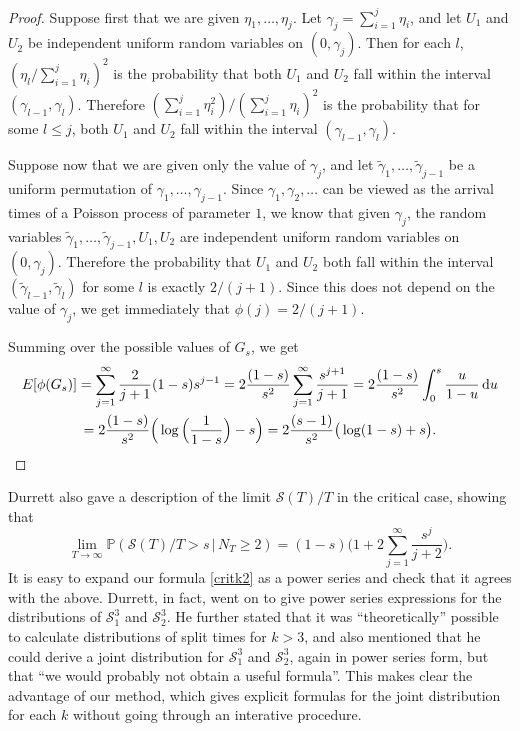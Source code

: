 \documentclass{article}
\theoremstyle{plain}
\theoremstyle{definition}
\renewcommand{\P}{\mathbb{P}}
\renewcommand{\d}{{\rm{d}}}
\renewcommand{\S}{\mathcal{S}}
\begin{document}
\begin{proof}
Suppose first that we are given $\eta_1,\ldots,\eta_j$. Let $\gamma_j = \sum_{i=1}^j \eta_i$, and let $U_1$ and $U_2$ be independent uniform random variables on $(0,\gamma_j)$. Then for each $l$, $(\eta_l/\sum_{i=1}^j \eta_i)^2$ is the probability that both $U_1$ and $U_2$ fall within the interval $(\gamma_{l-1},\gamma_l)$. Therefore  $(\sum_{i=1}^j \eta_i^2)/(\sum_{i=1}^j \eta_i)^2$ is the probability that for some $l\le j$, both $U_1$ and $U_2$ fall within the interval $(\gamma_{l-1},\gamma_l)$.

Suppose now that we are given only the value of $\gamma_j$, and let $\tilde\gamma_1,\ldots,\tilde\gamma_{j-1}$ be a uniform permutation of $\gamma_1,\ldots,\gamma_{j-1}$. Since $\gamma_1,\gamma_2,\ldots$ can be viewed as the arrival times of a Poisson process of parameter $1$, we know that given $\gamma_j$, the random variables $\tilde\gamma_1,\ldots,\tilde\gamma_{j-1},U_1,U_2$ are independent uniform random variables on $(0,\gamma_j)$. Therefore the probability that $U_1$ and $U_2$ both fall within the interval $(\tilde\gamma_{l-1},\tilde\gamma_l)$ for some $l$ is exactly $2/(j+1)$. Since this does not depend on the value of $\gamma_j$, we get immediately that $\phi(j) = 2/(j+1)$.

Summing over the possible values of $G_s$, we get
\begin{multline*}
E[\phi(G_s)] = \sum_{j=1}^\infty \frac{2}{j+1}(1-s)s^{j-1} = 2\frac{(1-s)}{s^2}\sum_{j=1}^\infty \frac{s^{j+1}}{j+1} = 2\frac{(1-s)}{s^2} \int_0^s \frac{u}{1-u}\,\d u\\
= 2\frac{(1-s)}{s^2}\Big(\log\Big(\frac{1}{1-s}\Big)-s\Big) = 2\frac{(s-1)}{s^2}\big(\log(1-s)+s\big).\qedhere
\end{multline*}
\end{proof}

Durrett \cite{durrett:genealogy} also gave a description of the limit $\S(T)/T$ in the critical case, showing that
\[\lim_{T\to\infty} \P(\S(T)/T > s \,|\, N_T\ge 2) = (1-s)\bigg(1+2\sum_{j=1}^\infty \frac{s^j}{j+2}\bigg).\]
It is easy to expand our formula \eqref{critk2} as a power series and check that it agrees with the above. Durrett, in fact, went on to give power series expressions for the distributions of $\S^3_1$ and $\S^3_2$. He further stated that it was ``theoretically'' possible to calculate distributions of split times for $k>3$, and also mentioned that he could derive a joint distribution for $\S^3_1$ and $\S^3_2$, again in power series form, but that ``we would probably not obtain a useful formula''. This makes clear the advantage of our method, which gives explicit formulas for the joint distribution for each $k$ without going through an interative procedure.
\end{document}
